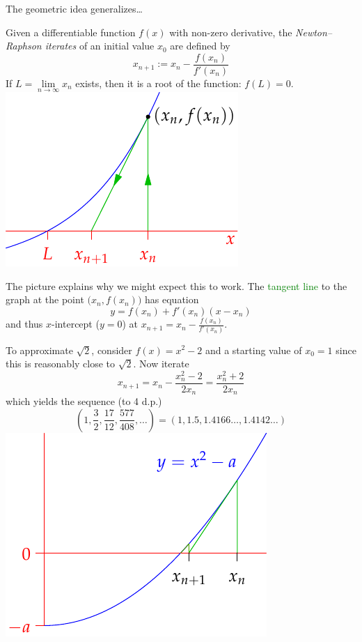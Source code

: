 The geometric idea generalizes\ldots

\begin{defn}[lower separated=false, sidebyside, sidebyside align=top seam, sidebyside gap=0pt, righthand width=0.35\linewidth]{}{}
	Given a differentiable function $f(x)$ with non-zero derivative, the \emph{Newton--Raphson iterates} of an initial value $x_0$ are defined by
	\[
		x_{n+1}:=x_n-\frac{f(x_n)}{f'(x_n)}
	\]
	If $L=\lim\limits_{n\to\infty}x_n$ exists, then it is a root of the function: $f(L)=0$.
	\tcblower
	\flushright\includegraphics{newton-raphson3}
\end{defn}

The picture explains why we might expect this to work. The \textcolor{Green}{tangent line} to the graph at the point $\bigl(x_n,f(x_n)\bigr)$ has equation
\[
	y=f(x_n)+f'(x_n)(x-x_n)
\]
and thus $x$-intercept ($y=0$) at $x_{n+1}=x_n-\frac{f(x_n)}{f'(x_n)}$.

\begin{example}[lower separated=false, sidebyside, sidebyside align=top seam, sidebyside gap=0pt, righthand width=0.4\linewidth]{}{}
	To approximate $\sqrt 2$, consider $f(x)=x^2-2$ and a starting value of $x_0=1$ since this is reasonably close to $\sqrt 2$. Now iterate
	\[
		x_{n+1}=x_n-\frac{x_n^2-2}{2x_n}=\frac{x_n^2+2}{2x_n} 
	\]
	which yields the sequence (to 4 d.p.)
	\[
		\left(1,\frac 32,\frac{17}{12},\frac{577}{408},\ldots\right)=(1,1.5,1.4166\ldots,1.4142\ldots)
	\]
	\tcblower
	\flushright\includegraphics{newton-raphson}
\end{example}

